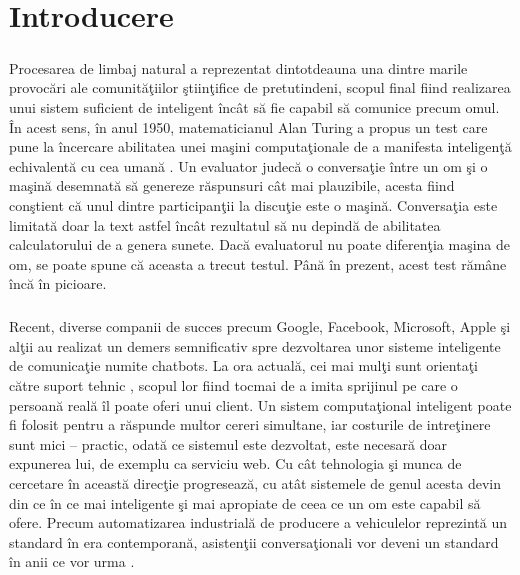 \chapter{Introducere}

\paragraph{}
Procesarea de limbaj natural a reprezentat dintotdeauna una dintre marile provoc\u ari ale comunit\u a\c tiilor \c stiin\c tifice de pretutindeni, scopul final fiind realizarea unui sistem suficient de inteligent \^ inc\^ at s\u a fie capabil s\u a comunice precum omul. \^ In acest sens, \^ in anul 1950, matematicianul Alan Turing a propus un test care pune la \^ incercare abilitatea unei ma\c sini computa\c tionale de a manifesta inteligen\c t\u a echivalent\u a cu cea uman\u a \cite{sep-turing-test}. Un evaluator judec\u a o conversa\c tie \^ intre un om \c si o ma\c sin\u a desemnat\u a s\u a genereze r\u aspunsuri c\^ at mai plauzibile, acesta fiind con\c stient c\u a unul dintre participan\c tii la discu\c tie este o ma\c sin\u a. Conversa\c tia este limitat\u a doar la text astfel \^ inc\^ at rezultatul s\u a nu depind\u a de abilitatea calculatorului de a genera sunete. Dac\u a evaluatorul nu poate diferen\c tia ma\c sina de om, se poate spune c\u a aceasta a trecut testul. P\^ an\u a \^ in prezent, acest test r\u am\^ ane \^ inc\u a \^ in picioare.

\paragraph{}
Recent, diverse companii de succes precum Google, Facebook, Microsoft, Apple \c si al\c tii au realizat un demers semnificativ spre dezvoltarea unor sisteme inteligente de comunica\c tie numite chatbots. La ora actual\u a, cei mai mul\c ti sunt orienta\c ti c\u atre suport tehnic \cite{support-chat-bots}, scopul lor fiind tocmai de a imita sprijinul pe care o persoan\u a real\u a \^ il poate oferi unui client. Un sistem computa\c tional inteligent poate fi folosit pentru a r\u aspunde multor cereri simultane, iar costurile de intre\c tinere sunt mici – practic, odat\u a ce sistemul este dezvoltat, este necesar\u a doar expunerea lui, de exemplu ca serviciu web. Cu c\^ at tehnologia \c si munca de cercetare \^ in aceast\u a direc\c tie progreseaz\u a, cu at\^ at sistemele de genul acesta devin din ce \^ in ce mai inteligente \c si mai apropiate de ceea ce un om este capabil s\u a ofere. Precum automatizarea industrial\u a de producere a vehiculelor reprezint\u a un standard \^ in era contemporan\u a, asisten\c tii conversa\c tionali vor deveni un standard \^ in anii ce vor urma \cite{business-chat-bots}.

